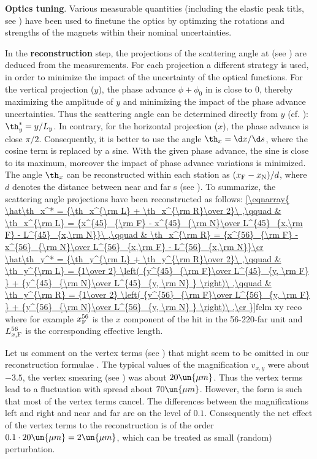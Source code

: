 \> {\bf Optics tuning}. Various measurable quantities (including the elastic peak titls, see ) have been used to finetune the optics by optimzing the rotations and strengths of the  magnets within their nominal uncertainties.

\> In the {\bf reconstruction} step, the projections of the scattering angle at  (see ) are deduced from the  measurements. For each projection a different strategy is used, in order to minimize the impact of the uncertainty of the optical functions. For the vertical projection ($y$), the phase advance $\phi+\phi_0$ in  is close to $0$, thereby maximizing the amplitude of $y$ and minimizing the impact of the phase advance uncertainties. Thus the scattering angle can be determined directly from $y$ (cf. ): $\th_y^* = y/L_y$. In contrary, for the horizontal projection ($x$), the phase advance is close $\pi/2$. Consequently, it is better to use the angle $\th_x = \d x/\d s$, where the cosine term is replaced by a sine. With the given phase advance, the sine is close to its maximum, moreover the impact of phase advance variations is minimized. The angle $\th_x$ can be reconstructed within each station as $(x_{\rm F} - x_{\rm N}) / d$, where $d$ denotes the distance between near and far s (see ). To summarize, the scattering angle projections have been reconstructed as follows:
\eqref{\eqnarray{
	\hat\th_x^* = {\th_x^{\rm L} + \th_x^{\rm R}\over 2}\ ,\qquad
		& \th_x^{\rm L} = {x^{45}_{\rm F} - x^{45}_{\rm N}\over L^{45}_{x,\rm F} - L^{45}_{x,\rm N}}\ ,\qquad
		& \th_x^{\rm R} = {x^{56}_{\rm F} - x^{56}_{\rm N}\over L^{56}_{x,\rm F} - L^{56}_{x,\rm N}}\cr
	\hat\th_y^* = {\th_y^{\rm L} + \th_y^{\rm R}\over 2}\ ,\qquad
		& \th_y^{\rm L} = {1\over 2} \left( {y^{45}_{\rm F}\over L^{45}_{y, \rm F} } + {y^{45}_{\rm N}\over L^{45}_{y, \rm N} } \right)\ ,\qquad
		& \th_y^{\rm R} = {1\over 2} \left( {y^{56}_{\rm F}\over L^{56}_{y, \rm F} } + {y^{56}_{\rm N}\over L^{56}_{y, \rm N} } \right)\ ,\cr
}}{felm xy reco}
where for example $x^{56}_{\rm F}$ is the $x$ component of the hit in the 56-220-far unit and $L^{56}_{x, \rm F}$ is the corresponding effective length. 

\par\parindent\itindent\indent\hang
Let us comment on the vertex terms (see ) that might seem to be omitted in our reconstruction formulae . The typical values of the magnification $v_{x, y}$ were about $-3.5$, the vertex smearing (see ) was about $20\un{\mu m}$. Thus the vertex terms lead to a fluctuation with spread about $70\un{\mu m}$. However, the form  is such that most of the vertex terms cancel. The differences between the magnifications left and right and near and far are on the level of $0.1$. Consequently the net effect of the vertex terms to the reconstruction is of the order $0.1 \cdot 20\un{\mu m} = 2\un{\mu m}$, which can be treated as small (random) perturbation.


